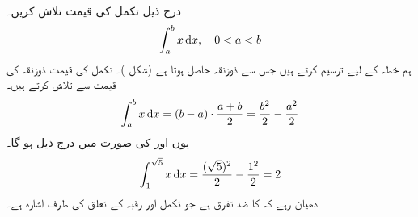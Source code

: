 \\
درج ذیل تکمل کی قیمت تلاش کریں۔
\begin{align*}
\int_a^bx\dif x, \quad 0<a<b
\end{align*}
ہم خطہ  کے لیے  ترسیم کرتے ہیں جس سے  ذوزنقہ حاصل ہوتا ہے (شکل )۔ تکمل کی قیمت ذوزنقہ کی قیمت سے تلاش کرتے ہیں۔
\begin{align*}
\int_a^b x\dif x=(b-a)\cdot \frac{a+b}{2}=\frac{b^2}{2}-\frac{a^2}{2}
\end{align*}  
یوں  اور  کی صورت میں درج ذیل ہو گا۔
\begin{align*}
\int_1^{\sqrt{5}} x\dif x=\frac{(\sqrt{5})^2}{2}-\frac{1^2}{2}=2
\end{align*} 
دھیان رہے کہ  کا ضد تفرق  ہے جو تکمل اور رقبہ کے تعلق کی طرف اشارہ ہے۔ 
